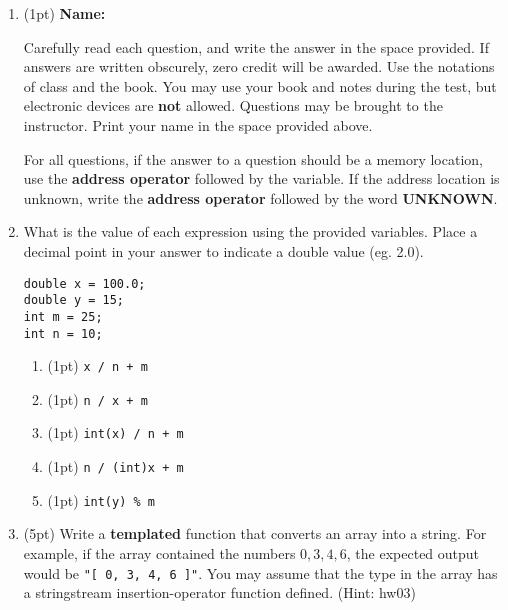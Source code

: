\documentclass{article}
\newcommand*{\pts}[1]{\addtocounter{points}{#1}(#1pt)}
\begin{document}
\begin{spacing}{1.4}

\begin{enumerate}[leftmargin=*]
\item \pts{1} \textbf{Name:} \hrulefill

Carefully read each question, and write the answer in the space
provided.  If answers are written obscurely, zero credit will be
awarded. Use the notations of class and the book. You may use your
book and notes during the test, but electronic devices are
\textbf{not} allowed. Questions may be brought to the
instructor. Print your name in the space provided above.

For all questions, if the answer to a question should be a memory
location, use the \textbf{address operator} followed by the
variable. If the address location is unknown, write the
\textbf{address operator} followed by the word \textbf{UNKNOWN}.
  

\item What is the value of each expression using the provided
  variables. Place a decimal point in your answer to indicate a double
  value (eg. 2.0).

\begin{lstlisting}
double x = 100.0;
double y = 15;
int m = 25;
int n = 10;
\end{lstlisting}

\begin{enumerate}

\item \pts{1} \underline{\hspace{1in}} \lstinline$x / n + m$

\item \pts{1} \underline{\hspace{1in}} \lstinline$n / x + m$

\item \pts{1} \underline{\hspace{1in}} \lstinline$int(x) / n + m$

\item \pts{1} \underline{\hspace{1in}} \lstinline$n / (int)x + m$

\item \pts{1} \underline{\hspace{1in}} \lstinline$int(y) % m$

\end{enumerate}

\item \pts{5} Write a \textbf{templated} function that converts an
  array into a string.  For example, if the array contained the
  numbers $0,3,4,6$, the expected output would be \lstinline$"[ 0, 3, 4, 6 ]"$. 
  You may assume that the type in the array has a
  stringstream insertion-operator function defined. (Hint: hw03)


\end{enumerate}
\end{spacing}
\end{document}
